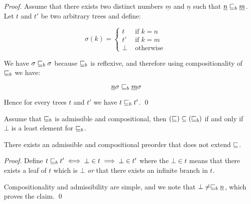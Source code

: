 \begin{ensps}

\begin{proof}
    Assume that there exists two distinct numbers $\underline{m}$
    and $\underline{n}$ such that $\underline{n} \sqsubseteq_b \underline{m}$.
    Let $t$ and $t'$ be 
    two arbitrary trees and define:

    \begin{equation*}
        \sigma(k) = \begin{cases}
            t  & \text{ if } k = n \\
            t' & \text{ if } k = m \\
            \bot  & \text{ otherwise } 
        \end{cases}
    \end{equation*}

    We have $\sigma \sqsubseteq_b \sigma$ because $\sqsubseteq_b$
    is reflexive, and therefore using compositionality 
    of $\sqsubseteq_b$ we have:

    \begin{equation*}
        \underline{n}\sigma \sqsubseteq_b \underline{m}\sigma
    \end{equation*}

    Hence for every trees $t$ and $t'$ we have 
    $t \sqsubseteq_b t'$.
\qed\end{proof}
\end{ensps}

\begin{alemma}
    \label{lem:coarserpreorder}
    Assume that $\sqsubseteq_b$ is admissible and compositional,
    then $(\sqsubseteq) \subseteq (\sqsubseteq_b)$ if and only if
    $\bot$ is a least element for $\sqsubseteq_b$.
\end{alemma}

\begin{ensps}
    
\begin{example}
    There exists an admissible and compositional 
    preorder that does not extend $\sqsubseteq$.
\end{example}

\begin{proof}
    Define $t \sqsubseteq_b t' \iff \bot \in t \implies \bot \in t'$ where
    the $\bot \in t$ means that there exists a leaf of $t$ 
    which is $\bot$ \emph{or} that there exists an infinite branch 
    in $t$.

    Compositionality and admissibility are simple, and we note 
    that $\bot \neq \sqsubseteq_b \underline{n}$, which proves 
    the claim.
\qed\end{proof}
\end{ensps}


